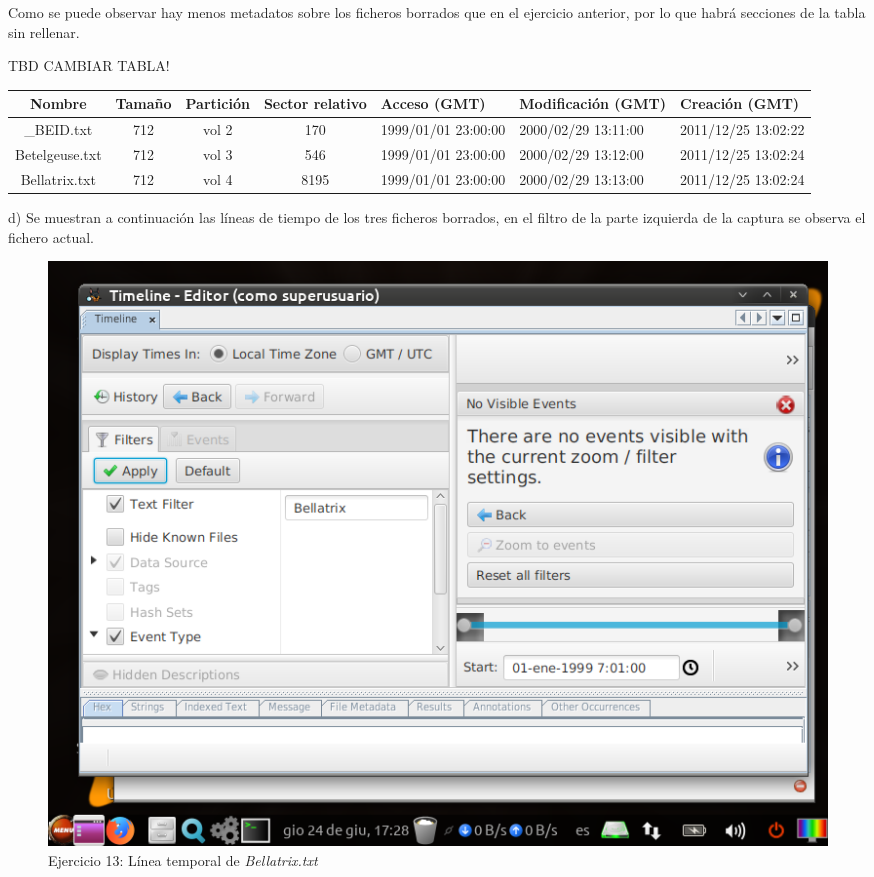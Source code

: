 \documentclass[11pt]{article}
\begin{document}
Como se puede observar hay menos metadatos sobre los ficheros borrados que en el ejercicio anterior, por lo que habrá secciones de la tabla sin rellenar.

TBD CAMBIAR TABLA!
\begin{table}[H]
    \centering
    \begin{tabular}{|c|c|c|c|p{2cm}|p{2cm}|p{2cm}|}
        \hline
        Nombre & Tamaño & Partición & Sector relativo & Acceso (GMT) & Modificación (GMT) & Creación (GMT) \\
        \hline\hline
        \_BEID.txt & 712 & vol 2 & 170 & 1999/01/01 23:00:00 & 2000/02/29 13:11:00 & 2011/12/25 13:02:22 \\
        \hline
        Betelgeuse.txt & 712 & vol 3 & 546 & 1999/01/01 23:00:00 & 2000/02/29 13:12:00 & 2011/12/25 13:02:24 \\
        \hline
        Bellatrix.txt & 712 & vol 4 & 8195 & 1999/01/01 23:00:00 & 2000/02/29 13:13:00 & 2011/12/25 13:02:24 \\
        \hline
    \end{tabular}
\end{table}

d) Se muestran a continuación las líneas de tiempo de los tres ficheros borrados, en el filtro de la parte izquierda de la captura se observa el fichero actual.

\begin{figure}[H]
    \caption{Ejercicio 13: Línea temporal de \textit{Bellatrix.txt}}
    \centering
    \includegraphics[scale=0.7]{e13-8.png}
\end{figure}
\end{document}
